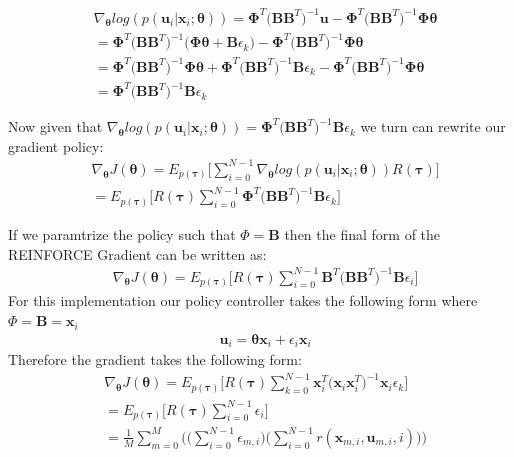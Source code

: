 \documentclass[11pt]{homework}
\renewcommand{\vec}[1]{\ensuremath{\boldsymbol{#1}}}
\begin{document}
\begin{arabicparts}
	\begin{align*}
		& \nabla_{\vec{\theta}}log(p(\vec{u}_{i}|\vec{x}_{i};\vec{\theta})) = \vec{\Phi}^{T}\Big(\vec{B}\vec{B}^T\Big)^{-1}\vec{u} - \vec{\Phi}^{T}\Big(\vec{B}\vec{B}^T\Big)^{-1}\vec{\Phi}\vec{\theta} \\
		& = \vec{\Phi}^{T}\Big(\vec{B}\vec{B}^T\Big)^{-1}\Bigg( \vec{\Phi}\vec{\theta} + \vec{B}\epsilon_{k}  \Bigg) - \vec{\Phi}^{T}\Big(\vec{B}\vec{B}^T\Big)^{-1}\vec{\Phi}\vec{\theta} \\
		& = \vec{\Phi}^{T}\Big(\vec{B}\vec{B}^T\Big)^{-1}\vec{\Phi}\vec{\theta} + \vec{\Phi}^{T}\Big(\vec{B}\vec{B}^T\Big)^{-1}\vec{B}\epsilon_{k} - \vec{\Phi}^{T}\Big(\vec{B}\vec{B}^T\Big)^{-1}\vec{\Phi}\vec{\theta} \\
		& = \vec{\Phi}^{T}\Big(\vec{B}\vec{B}^T\Big)^{-1}\vec{B}\epsilon_{k}
	\end{align*}
	
	Now given that $\nabla_{\vec{\theta}}log(p(\vec{u}_{i}|\vec{x}_{i};\vec{\theta})) = \vec{\Phi}^{T}\Big(\vec{B}\vec{B}^T\Big)^{-1}\vec{B}\epsilon_{k}$ we turn can rewrite our gradient policy: 
	\begin{align*}
		& \nabla_{\vec{\theta}}J(\vec{\theta}) = E_{p(\vec{\tau})}\Bigg[\sum_{i=0}^{N-1}\nabla_{\vec{\theta}}log(p(\vec{u}_{i}|\vec{x}_{i};\vec{\theta}))R(\vec{\tau})\Bigg] \\
		& = E_{p(\vec{\tau})}\Bigg[R(\vec{\tau})\sum_{i=0}^{N-1} \vec{\Phi}^{T}\Big(\vec{B}\vec{B}^T\Big)^{-1}\vec{B}\epsilon_{k}\Bigg]
	\end{align*}
	
	If we paramtrize the policy such that $\Phi = \vec{B}$ then the final form of the REINFORCE Gradient can be written as: 
	\begin{align*}
		& \nabla_{\vec{\theta}}J(\vec{\theta}) = E_{p(\vec{\tau})}\Bigg[R(\vec{\tau})\sum_{i=0}^{N-1} \vec{B}^{T}\Big(\vec{B}\vec{B}^T\Big)^{-1}\vec{B}\epsilon_{i}\Bigg]
	\end{align*}
	For this implementation our policy controller takes the following form where $\Phi = \vec{B} = \vec{x}_{i}$
	\begin{align*}
		& \vec{u}_i = \vec{\vec{\theta}}\vec{x}_{i} + \epsilon_{i}\vec{x}_{i} 
	\end{align*}
	Therefore the gradient takes the following form: 
	\begin{align*}
		& \nabla_{\vec{\theta}}J(\vec{\theta}) = E_{p(\vec{\tau})}\Bigg[R(\vec{\tau})\sum_{k=0}^{N-1} \vec{x}_{i}^{T}\Big(\vec{x}_{i}\vec{x}_{i}^T\Big)^{-1}\vec{x}_{i}\epsilon_{k}\Bigg] \\
		& = E_{p(\vec{\tau})}\Bigg[R(\vec{\tau})\sum_{i=0}^{N-1}\epsilon_{i}\Bigg] \\
		& = \frac{1}{M}\sum_{m=0}^{M}\Bigg(\Big(\sum_{i=0}^{N-1}\epsilon_{m,i}\Big) \Big(\sum_{i=0}^{N-1} r(\vec{x}_{m,i},\vec{u}_{m,i},i)\Big) \Bigg)
	\end{align*}


\end{arabicparts}
\end{document}
